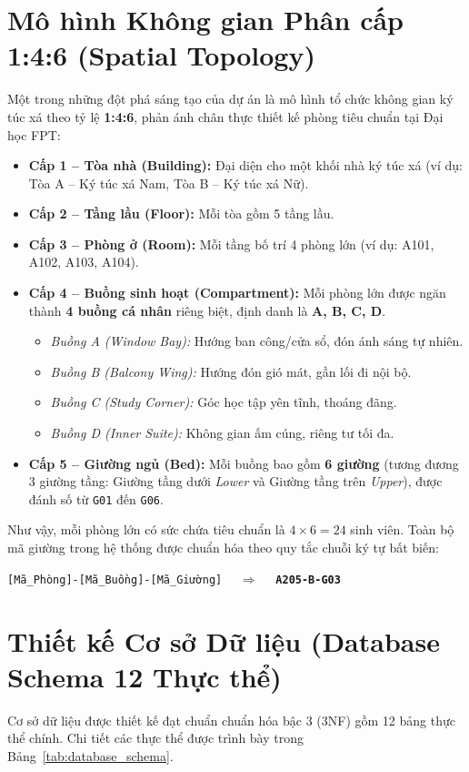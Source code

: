 \section{Mô hình Không gian Phân cấp 1:4:6 (Spatial Topology)}
Một trong những đột phá sáng tạo của dự án là mô hình tổ chức không gian ký túc xá theo tỷ lệ \textbf{1:4:6}, phản ánh chân thực thiết kế phòng tiêu chuẩn tại Đại học FPT:
\begin{itemize}
    \item \textbf{Cấp 1 -- Tòa nhà (Building):} Đại diện cho một khối nhà ký túc xá (ví dụ: Tòa A -- Ký túc xá Nam, Tòa B -- Ký túc xá Nữ).
    \item \textbf{Cấp 2 -- Tầng lầu (Floor):} Mỗi tòa gồm 5 tầng lầu.
    \item \textbf{Cấp 3 -- Phòng ở (Room):} Mỗi tầng bố trí 4 phòng lớn (ví dụ: A101, A102, A103, A104).
    \item \textbf{Cấp 4 -- Buồng sinh hoạt (Compartment):} Mỗi phòng lớn được ngăn thành \textbf{4 buồng cá nhân} riêng biệt, định danh là \textbf{A, B, C, D}.
    \begin{itemize}
        \item \textit{Buồng A (Window Bay):} Hướng ban công/cửa sổ, đón ánh sáng tự nhiên.
        \item \textit{Buồng B (Balcony Wing):} Hướng đón gió mát, gần lối đi nội bộ.
        \item \textit{Buồng C (Study Corner):} Góc học tập yên tĩnh, thoáng đãng.
        \item \textit{Buồng D (Inner Suite):} Không gian ấm cúng, riêng tư tối đa.
    \end{itemize}
    \item \textbf{Cấp 5 -- Giường ngủ (Bed):} Mỗi buồng bao gồm \textbf{6 giường} (tương đương 3 giường tầng: Giường tầng dưới \textit{Lower} và Giường tầng trên \textit{Upper}), được đánh số từ \texttt{G01} đến \texttt{G06}.
\end{itemize}

Như vậy, mỗi phòng lớn có sức chứa tiêu chuẩn là $4 \times 6 = 24$ sinh viên. Toàn bộ mã giường trong hệ thống được chuẩn hóa theo quy tắc chuỗi ký tự bất biến:
\begin{center}
    \texttt{[Mã\_Phòng]-[Mã\_Buồng]-[Mã\_Giường]} $\quad\Longrightarrow\quad$ \textbf{\texttt{A205-B-G03}}
\end{center}

\section{Thiết kế Cơ sở Dữ liệu (Database Schema 12 Thực thể)}
Cơ sở dữ liệu được thiết kế đạt chuẩn chuẩn hóa bậc 3 (3NF) gồm 12 bảng thực thể chính. Chi tiết các thực thể được trình bày trong Bảng~\ref{tab:database_schema}.

